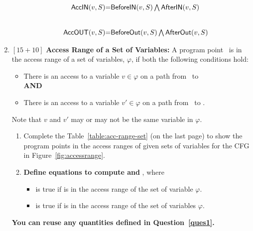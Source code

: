 \documentclass[12pt]{article}
\newcommand{\answer}[1]{{{\blue #1}}}
\renewcommand{\answer}[1]{\mbox{}}
\begin{document}
\begin{enumerate}
\begin{enumerate}
{\[
\begin{array}{@{}r@{}c@{}l}
\inacc{v}{S} &=& \indef{v}{S} \bigwedge \inuse{v}{S} \\ \\ \\
\outacc{v}{S} &=& \outdef{v}{S} \bigwedge \outuse{v}{S}
\end{array}\]

}
\end{enumerate}
\answer{\clearpage}
\newcommand{\vset}{\ensuremath{\varphi}}
\item $[15+10]$  {\bf Access Range of a Set of Variables:} A program point \pt\ is in the access range of a set of variables, \vset, if both the following conditions hold:
  \begin{itemize}
  \item  There is an access to a variable $v \in \vset$ on a path from \fgentry\ to \pt \\[5pt] {\bf AND}
  \item There is an access to a variable $v' \in \vset$ on a path from \pt\ to \fgexit. 
  \end{itemize}
Note that $v$ and $v'$ may or may not be the same variable in \vset.
\begin{enumerate}
\item Complete the Table~\ref{table:acc-range-set} (on the last
  page) to show the program points in the access ranges of given
  sets of variables for the CFG in Figure~\ref{fig:accessrange}.
\item {\bf Define equations to compute \inaccset{S}{\vset} and \outaccset{S}{\vset}}, where
\begin{itemize}
\item \inaccset{S}{\vset} is true if  is in the access range of the set of variable $\vset$.  
\item \outaccset{S}{\vset} is true if 
  is in the access range of the set of variables $\vset$.
\end{itemize}
\end{enumerate}
{\bf You can reuse any quantities defined in Question~\ref{ques1}.}
\answer{
\[
\begin{array}{@{}r@{}c@{}l}
\inaccset{\varphi}{S} &=& (\bigvee\limits_{v \in \varphi} \indef{v}{S}) \bigwedge (\bigvee\limits_{v \in \varphi} \inuse{v}{S}) \\
\outaccset{\varphi}{S} &=& (\bigvee\limits_{v \in \varphi} \outdef{v}{S}) \bigwedge (\bigvee\limits_{v \in \varphi} \outuse{v}{S}) 
\end{array}\]
{\color{red}
Note that these {\em simple} definitions {\bf do not work}:
\[\begin{array}{@{}r@{}c@{}l}
\rnode{x0}{}\qquad\inaccset{\varphi}{S}  &=& \bigvee\limits_{v \in \varphi}\inacc{v}{S}\qquad \rnode{x1}{}\\
\rnode{x2}{}\quad\outaccset{\varphi}{S} &=& \bigvee\limits_{v \in \varphi}\outacc{v}{S}\quad\rnode{x3}{}\\
\end{array}\]

}}
\end{enumerate}
\end{document}
